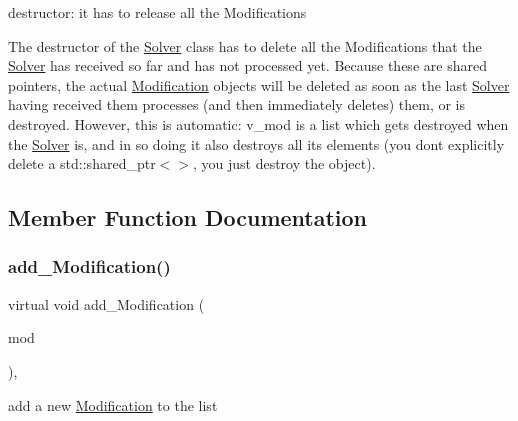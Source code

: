 destructor\+: it has to release all the Modifications 

The destructor of the \mbox{\hyperlink{class_s_m_spp__di__unipi__it_1_1_solver}{Solver}} class has to delete all the Modifications that the \mbox{\hyperlink{class_s_m_spp__di__unipi__it_1_1_solver}{Solver}} has received so far and has not processed yet. Because these are shared pointers, the actual \mbox{\hyperlink{class_s_m_spp__di__unipi__it_1_1_modification}{Modification}} objects will be deleted as soon as the last \mbox{\hyperlink{class_s_m_spp__di__unipi__it_1_1_solver}{Solver}} having received them processes (and then immediately deletes) them, or is destroyed. However, this is automatic\+: v\+\_\+mod is a list which gets destroyed when the \mbox{\hyperlink{class_s_m_spp__di__unipi__it_1_1_solver}{Solver}} is, and in so doing it also destroys all its elements (you don\textquotesingle{}t explicitly delete a std\+::shared\+\_\+ptr$<$$>$, you just destroy the object). 

\subsection{Member Function Documentation}
\mbox{\label{class_s_m_spp__di__unipi__it_1_1_solver_ae71b15277f34912175559c36e04f98fd}} 
\subsubsection{\texorpdfstring{add\+\_\+\+Modification()}{add\_Modification()}}
{\footnotesize\ttfamily virtual void add\+\_\+\+Modification (\begin{DoxyParamCaption}\item[{\mbox{\hyperlink{group___modification___t_y_p_e_s_ga9024cf2ead61a1280d29771b063b1a62}{sp\+\_\+\+Mod}} \&}]{mod }\end{DoxyParamCaption})\hspace{0.3cm}{\ttfamily [inline]}, {\ttfamily [virtual]}}



add a new \mbox{\hyperlink{class_s_m_spp__di__unipi__it_1_1_modification}{Modification}} to the list 

